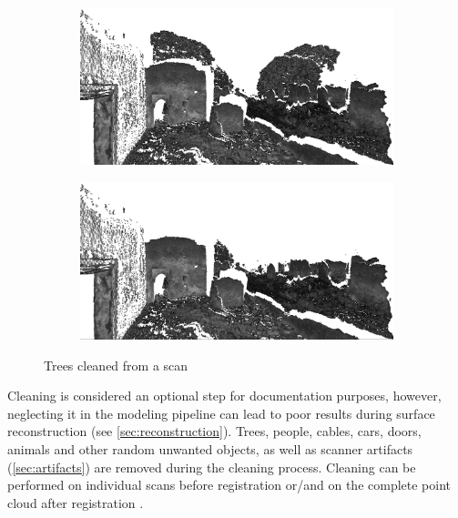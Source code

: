 \begin{figure}[ht]
	\begin{subfigure}[b]{.5\textwidth}
	  \centering
	  \includegraphics[width=.9\linewidth]{images/dirty}
	\end{subfigure}%
	\begin{subfigure}[b]{.5\textwidth}
	  \centering
	  \includegraphics[width=.9\linewidth]{images/clean}
	\end{subfigure}
  \caption{Trees cleaned from a scan}
  \label{fig:cleaning}
\end{figure}

Cleaning is considered an optional step for documentation purposes, however, neglecting it in the modeling pipeline can lead to poor results during surface reconstruction (see \autoref{sec:reconstruction}). Trees, people, cables, cars, doors, animals and other random unwanted objects, as well as scanner artifacts (\autoref{sec:artifacts}) are removed during the cleaning process. Cleaning can be performed on individual scans before registration or/and on the complete point cloud after registration \cite{Ruther2011}.

